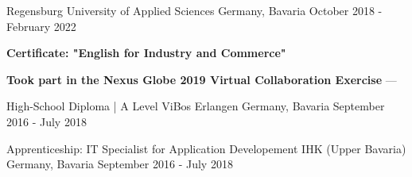 

\begin{cventries}
  \cventry
    {} %
    {Regensburg University of Applied Sciences} %
    {Germany, Bavaria} %
    {October 2018 - February 2022} %
    {
      \begin{cvitems} %
        \item {\textbf{Certificate: "English for Industry and Commerce"}}
        \vspace{0.5mm}
        \item {\textbf{Took part in the Nexus Globe 2019 Virtual Collaboration Exercise} --- }
      \end{cvitems}
    }

  \cventry
    {High-School Diploma | A Level} %
    {ViBos Erlangen} %
    {Germany, Bavaria} %
    {September 2016 - July 2018} %
    {}

  \cventry
    {Apprenticeship: IT Specialist for Application Developement} %
    {IHK (Upper Bavaria)} %
    {Germany, Bavaria} %
    {September 2016 - July 2018} %
    {}
\end{cventries}